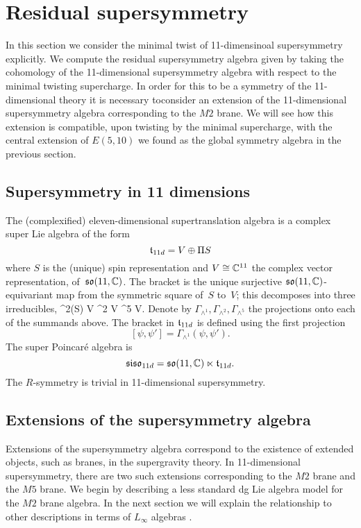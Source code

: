 \section{Residual supersymmetry} 
\label{sec:susy}

In this section we consider the minimal twist of 11-dimensinoal supersymmetry explicitly. 
We compute the residual supersymmetry algebra given by taking the cohomology of the 11-dimensional supersymmetry algebra with respect to the minimal twisting supercharge. 
In order for this to be a symmetry of the 11-dimensional theory it is necessary toconsider an extension of the 11-dimensional supersymmetry algebra corresponding to the $M2$ brane.
We will see how this extension is compatible, upon twisting by the minimal supercharge, with the central extension of $E(5,10)$ we found as the global symmetry algebra in the previous section. 

\subsection{Supersymmetry in 11 dimensions}
\label{sec:11dsusy}

The (complexified) eleven-dimensional supertranslation algebra is a complex super Lie algebra of the form
\[
  \mathfrak t_{11d} = V \oplus \Pi S
\]
where $S$ is the (unique) spin representation and $V \cong \mathbb C^{11}$ the complex vector representation, of~$\mathfrak{so}(11, \mathbb C)$. 
The bracket is the unique surjective $\mathfrak{so}(11,\mathbb C)$-equivariant map from the symmetric square of~$S$ to~$V$;
this decomposes into three irreducibles, 
\beqn\label{eqn:decomp}
  \Sym^2(S) \cong V \oplus \wedge^2 V \oplus \wedge^5 V.
\eeqn
Denote by $\Gamma_{\wedge^1}, \Gamma_{\wedge^2}, \Gamma_{\wedge^5}$ the projections onto each of the summands above. 
The bracket in $\mathfrak t_{11d}$ is defined using the first projection
\[
[\psi, \psi'] = \Gamma_{\wedge^1} (\psi, \psi') .
\]
The super Poincar\'{e} algebra is
\[
  \mathfrak{siso}_{11d} = \mathfrak{so}(11 , \mathbb C) \ltimes \mathfrak t_{11d} .
\]
The $R$-symmetry is trivial in 11-dimensional supersymmetry. 

\subsection{Extensions of the supersymmetry algebra} 
\label{sec:m2brane}

Extensions of the supersymmetry algebra correspond to the existence of extended objects, such as branes, in the supergravity theory.
In 11-dimensional supersymmetry, there are two such extensions corresponding to the $M2$ brane and the $M5$ brane.
We begin by describing a less standard dg Lie algebra model for the $M2$ brane algebra.
In the next section we will explain the relationship to other descriptions in terms of $L_\infty$ algebras \cite{Basu_2005,Bagger_2007,fiorenza2015super}. 

